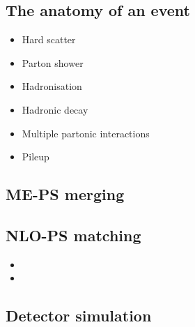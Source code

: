 
\subsection{The anatomy of an event}
\begin{itemize}
	\item Hard scatter
	\item Parton shower
	\item Hadronisation
	\item Hadronic decay
	\item Multiple partonic interactions
	\item Pileup
\end{itemize}

\subsection{ME-PS merging}

\subsection{NLO-PS matching}
\begin{itemize}
	\item \mcatnlo
	\item \powheg
\end{itemize}

\subsection{Detector simulation}